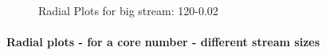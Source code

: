 \documentclass[12pt,a4paper]{article}
\begin{document}
\begin{figure}[H]
    \caption{Radial Plots for big stream: 120-0.02}
    \label{img:exps-read-input-variants}
\end{figure}

\paragraph{Radial plots - for a core number - different stream sizes\\}
\newpage

\begin{figure}[H]
    \centering
\end{figure}
\end{document}
